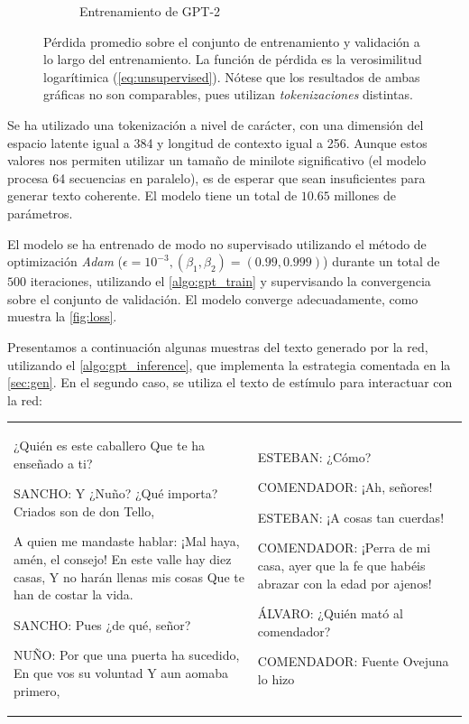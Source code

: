 \begin{figure}[tb]
\begin{subfigure}[b]{0.49\textwidth}
        \caption{Entrenamiento de GPT-2}
        \label{fig:loss_big}
    \end{subfigure}
    \caption{Pérdida promedio sobre el conjunto de entrenamiento y validación a lo largo del entrenamiento. La función de pérdida es la verosimilitud logarítimica (\cref{eq:unsupervised}). Nótese que los resultados de ambas gráficas no son comparables, pues utilizan \textit{tokenizaciones} distintas.}
\end{figure}

Se ha utilizado una tokenización a nivel de carácter, con una dimensión del espacio latente igual a 384 y longitud de contexto igual a 256. Aunque estos valores nos permiten utilizar un tamaño de minilote significativo (el modelo procesa 64 secuencias en paralelo), es de esperar que sean insuficientes para generar texto coherente. El modelo tiene un total de \( 10.65 \) millones de parámetros.

El modelo se ha entrenado de modo no supervisado utilizando el método de optimización \textit{Adam} (\( \epsilon = 10^{-3}, (\beta_1, \beta_2) = (0.99, 0.999) \)) durante un total de \( 500 \) iteraciones, utilizando el \cref{algo:gpt_train} y supervisando la convergencia sobre el conjunto de validación. El modelo converge adecuadamente, como muestra la \cref{fig:loss}.

Presentamos a continuación algunas muestras del texto generado por la red, utilizando el \cref{algo:gpt_inference}, que implementa la estrategia comentada en la \cref{sec:gen}. En el segundo caso, se utiliza el texto de estímulo para interactuar con la red: 

\noindent
\begin{table}[H]
  \centering
  \begin{tabular}{ l | l }
    \begin{Code}
    ¿Quién es este caballero
    Que te ha enseñado a ti?
    
    SANCHO:
    Y ¿Nuño? ¿Qué importa?
    Criados son de don Tello,

    A quien me mandaste hablar:
    ¡Mal haya, amén, el consejo!
    En este valle hay diez casas,
    Y no harán llenas mis cosas
    Que te han de costar la vida.
    
    SANCHO:
    Pues ¿de qué, señor?

    NUÑO:
    Por que una puerta ha sucedido,
    En que vos su voluntad
    Y aun aomaba primero,
    \end{Code}
    &
    \begin{Code}
    ESTEBAN:
    ¿Cómo?
    
    COMENDADOR:
    ¡Ah, señores!
    
    ESTEBAN:
    ¡A cosas tan cuerdas!

    COMENDADOR:
    ¡Perra de mi casa, ayer
    que la fe que habéis abrazar
    con la edad por ajenos!

    ÁLVARO:
    ¿Quién mató al comendador?
    
    COMENDADOR:
    Fuente Ovejuna lo hizo
    \end{Code}
  \end{tabular}
\end{table}

